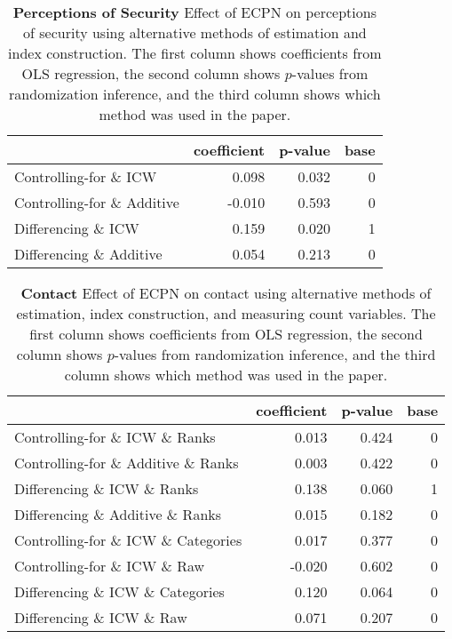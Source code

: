 \documentclass[
]{article}
\begin{document}
\begin{table}[H]
\begin{center}
\label{tab:security_tab}
\caption{\textbf{Perceptions of Security} Effect of ECPN on perceptions of security using alternative methods of estimation and index construction. The first column shows coefficients from OLS regression, the second column shows $p$-values from randomization inference, and the third column shows which method was used in the paper.}
\smallskip

\begin{tabular}{l|r|r|r}
\hline
  & coefficient & p-value & base\\
\hline
Controlling-for \& ICW & 0.098 & 0.032 & 0\\
\hline
Controlling-for \& Additive & -0.010 & 0.593 & 0\\
\hline
Differencing \& ICW & 0.159 & 0.020 & 1\\
\hline
Differencing \& Additive & 0.054 & 0.213 & 0\\
\hline
\end{tabular}


\end{center}
\end{table}

\begin{table}[H]
\begin{center}
\label{tab:contact_tab}
\caption{\textbf{Contact} Effect of ECPN on contact using alternative methods of estimation, index construction, and measuring count variables. The first column shows coefficients from OLS regression, the second column shows $p$-values from randomization inference, and the third column shows which method was used in the paper.}
\smallskip

\begin{tabular}{l|r|r|r}
\hline
  & coefficient & p-value & base\\
\hline
Controlling-for \& ICW \& Ranks & 0.013 & 0.424 & 0\\
\hline
Controlling-for \& Additive \& Ranks & 0.003 & 0.422 & 0\\
\hline
Differencing \& ICW \& Ranks & 0.138 & 0.060 & 1\\
\hline
Differencing \& Additive \& Ranks & 0.015 & 0.182 & 0\\
\hline
Controlling-for \& ICW \& Categories & 0.017 & 0.377 & 0\\
\hline
Controlling-for \& ICW \& Raw & -0.020 & 0.602 & 0\\
\hline
Differencing \& ICW \& Categories & 0.120 & 0.064 & 0\\
\hline
Differencing \& ICW \& Raw & 0.071 & 0.207 & 0\\
\hline
\end{tabular}


\end{center}
\end{table}
\end{document}
